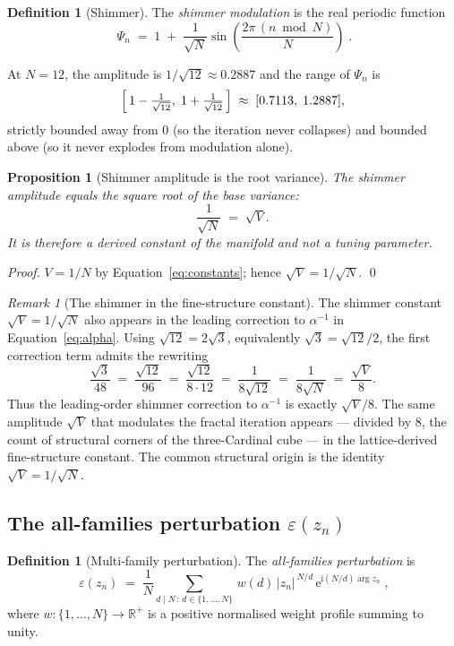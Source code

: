 \documentclass[11pt,a4paper]{article}
\newtheorem{proposition}[theorem]{Proposition}
\theoremstyle{definition}
\newtheorem{definition}[theorem]{Definition}
\theoremstyle{remark}
\newtheorem{remark}[theorem]{Remark}
\newcommand{\R}{\mathbb{R}}
\begin{document}
\begin{definition}[Shimmer]\label{def:shimmer}
The \emph{shimmer modulation} is the real periodic function
\[
\boxed{\;\Psi_{n} \;=\; 1 \;+\; \frac{1}{\sqrt{N}}\sin\!\left(\frac{2\pi\,(n\bmod N)}{N}\right)\;.}
\]
\end{definition}

At $N=12$, the amplitude is $1/\sqrt{12}\approx 0.2887$ and the range of $\Psi_{n}$ is
\[
\Bigl[\,1-\tfrac{1}{\sqrt{12}},\;1+\tfrac{1}{\sqrt{12}}\,\Bigr]\;\approx\;[0.7113,\;1.2887],
\]
strictly bounded away from $0$ (so the iteration never collapses) and bounded above (so it never explodes from modulation alone).

\begin{proposition}[Shimmer amplitude is the root variance]\label{prop:shimmer-V}
The shimmer amplitude equals the square root of the base variance:
\[
\frac{1}{\sqrt{N}} \;=\; \sqrt{V}.
\]
It is therefore a derived constant of the manifold and not a tuning parameter.
\end{proposition}
\begin{proof}
$V = 1/N$ by Equation~\eqref{eq:constants}; hence $\sqrt{V} = 1/\sqrt{N}$. \qed
\end{proof}

\begin{remark}[The shimmer in the fine-structure constant]
The shimmer constant $\sqrt{V}=1/\sqrt{N}$ also appears in the leading correction to $\alpha^{-1}$ in Equation~\eqref{eq:alpha}. Using $\sqrt{12}=2\sqrt{3}$, equivalently $\sqrt{3}=\sqrt{12}/2$, the first correction term admits the rewriting
\[
\frac{\sqrt{3}}{48} \;=\; \frac{\sqrt{12}}{96} \;=\; \frac{\sqrt{12}}{8\cdot 12} \;=\; \frac{1}{8\sqrt{12}} \;=\; \frac{1}{8\sqrt{N}} \;=\; \frac{\sqrt{V}}{8}.
\]
Thus the leading-order shimmer correction to $\alpha^{-1}$ is exactly $\sqrt{V}/8$. The same amplitude $\sqrt{V}$ that modulates the fractal iteration appears --- divided by $8$, the count of structural corners of the three-Cardinal cube --- in the lattice-derived fine-structure constant. The common structural origin is the identity $\sqrt{V}=1/\sqrt{N}$.
\end{remark}

\subsection{The all-families perturbation $\varepsilon(z_{n})$}\label{subsec:dI-perturb}

\begin{definition}[Multi-family perturbation]\label{def:dI-eps}
The \emph{all-families perturbation} is
\[
\boxed{\;\varepsilon(z_{n}) \;=\; \frac{1}{N}\sum_{d\mid N\,:\,d\in\{1,\ldots,N\}}\, w(d)\,|z_{n}|^{\,N/d}\,\mathrm{e}^{\mathrm{i}(N/d)\arg z_{n}}\;,}
\]
where $w:\{1,\ldots,N\}\to\R^{+}$ is a positive normalised weight profile summing to unity.
\end{definition}
\end{document}
